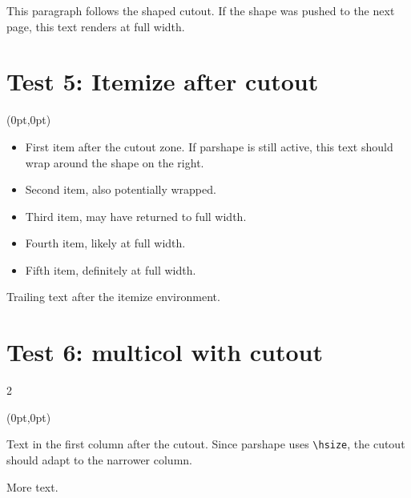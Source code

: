 \documentclass[11pt,a4paper]{article}
\begin{document}
This paragraph follows the shaped cutout. If the shape was pushed
to the next page, this text renders at full width. \lipsum[7]

\newpage

\section{Test 5: Itemize after cutout}

(0pt,0pt)\par

\begin{itemize}
  \item First item after the cutout zone. If parshape is still
    active, this text should wrap around the shape on the right.
  \item Second item, also potentially wrapped.
  \item Third item, may have returned to full width.
  \item Fourth item, likely at full width.
  \item Fifth item, definitely at full width.
\end{itemize}

Trailing text after the itemize environment.

\section{Test 6: multicol with cutout}

\begin{multicols}{2}

(0pt,0pt)\par

Text in the first column after the cutout. Since parshape uses
\texttt{\textbackslash hsize}, the cutout should adapt to the
narrower column. \lipsum[8]

More text. \lipsum[9]

\lipsum[10-11]

\end{multicols}
\end{document}
